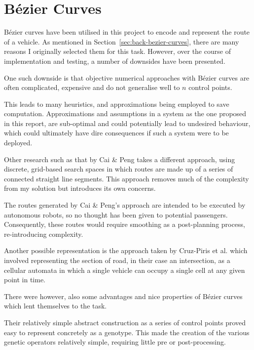 \section{Bézier Curves}
\label{sec:eval:bezier}

Bézier curves have been utilised in this project to encode and represent the route of a vehicle. As mentioned in Section~\ref{sec:back-bezier-curves}, there are many reasons I originally selected them for this task. However, over the course of implementation and testing, a number of downsides have been presented.

One such downside is that objective numerical approaches with Bézier curves are often complicated, expensive and do not generalise well to $n$ control points.

This leads to many heuristics, and approximations being employed to save computation. Approximations and assumptions in a system as the one proposed in this report, are sub-optimal and could potentially lead to undesired behaviour, which could ultimately have dire consequences if such a system were to be deployed.

Other research such as that by Cai \& Peng\cite{caiCooperativeCoevolutionaryAdaptive2002} takes a different approach, using discrete, grid-based search spaces in which routes are made up of a series of connected straight line segments. This approach removes much of the complexity from my solution but introduces its own concerns.

The routes generated by Cai \& Peng's approach are intended to be executed by autonomous robots, so no thought has been given to potential passengers. Consequently, these routes would require smoothing as a post-planning process, re-introducing complexity.

Another possible representation is the approach taken by Cruz-Piris et al.\cite{cruz-pirisAutomatedOptimizationIntersections2019} which involved representing the section of road, in their case an intersection, as a cellular automata in which a single vehicle can occupy a single cell at any given point in time.

There were however, also some advantages and nice properties of Bézier curves which lent themselves to the task.

Their relatively simple abstract construction as a series of control points proved easy to represent concretely as a genotype. This made the creation of the various genetic operators relatively simple, requiring little pre or post-processing.

